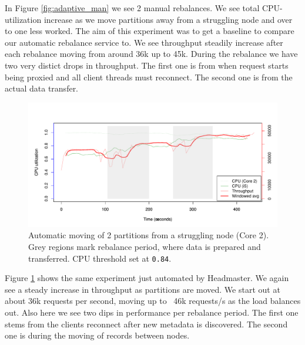 In Figure \ref{fig:adaptive_man} we see 2 manual rebalances. We see total CPU-utilization increase as we move partitions away from a struggling node and over to one less worked. The aim of this experiment was to get a baseline to compare our automatic rebalance service to. We see throughput steadily increase after each rebalance moving from around 36k up to 45k. During the rebalance we have two very distict drops in throughput. The first one is from when request starts being proxied and all client threads must reconnect. The second one is from the actual data transfer. 

\clearpage
\begin{figure}[h]
    \centering
    \includegraphics[width=1.1\textwidth]{results/rebalance_auto_2node}
    \caption{Automatic moving of 2 partitions from a struggling node (Core 2). Grey regions mark rebalance period, where data is prepared and transferred. CPU threshold set at \texttt{0.84}.}
    \label{fig:adaptive_auto}
\end{figure}
Figure \ref{fig:adaptive_auto} shows the same experiment just automated by Headmaster. We again see a steady increase in throughput as partitions are moved. We start out at about 36k requests per second, moving up to ~46k requests/s as the load balances out. Also here we see two dips in performance per rebalance period. The first one stems from the clients reconnect after new metadata is discovered. The second one is during the moving of records between nodes.


